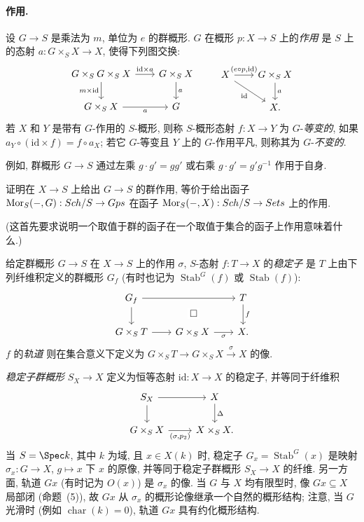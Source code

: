 \paragraph{作用.}
\begin{definition}[作用]\label{src:B.1.10}
设 $G\to S$ 是乘法为 $m$, 单位为 $e$ 的群概形. $G$ 在概形 $p:X\to S$ 上的\textit{作用} 是 $S$ 上的态射 $a:G\times_S X\to X$, 使得下列图交换:
\[
\begin{tikzcd}[column sep=2em]
G\times_S G\times_S X\arrow[r,"\mathrm{id}\times a"]\arrow[d,"m\times\mathrm{id}"']&G\times_S X\arrow[d,"a"]\\
G\times_S X\arrow[r,"a"']&G
\end{tikzcd}
\qquad
\begin{tikzcd}[column sep=2em]
X\arrow[r,"{(e\circ p,\mathrm{id})}"]\arrow[dr,"\mathrm{id}"']&G\times_S X\arrow[d,"a"]\\
&X.
\end{tikzcd}
\]
若 $X$ 和 $Y$ 是带有 $G$-作用的 $S$-概形, 则称 $S$-概形态射 $f:X\to Y$ 为 $G$-\textit{等变的}, 如果 $a_Y\circ(\mathrm{id}\times f)=f\circ a_X$; 若它 $G$-等变且 $Y$ 上的 $G$-作用平凡, 则称其为 $G$-\textit{不变的}.
\end{definition}
例如, 群概形 $G\to S$ 通过左乘 $g\cdot g'=gg'$ 或右乘 $g\cdot g'=g'g^{-1}$ 作用于自身.
\begin{exercise}\label{src:B.1.11}
证明在 $X\to S$ 上给出 $G\to S$ 的群作用, 等价于给出函子 $\operatorname{Mor}_S(-,G):Sch/S\to Gps$ 在函子 $\operatorname{Mor}_S(-,X):Sch/S\to Sets$ 上的作用.

(这首先要求说明一个取值于群的函子在一个取值于集合的函子上作用意味着什么.)
\end{exercise}
\begin{definition}[稳定子与轨道]\label{src:B.1.12}
给定群概形 $G\to S$ 在 $X\to S$ 上的作用 $\sigma$, $S$-态射 $f:T\to X$ 的\textit{稳定子} 是 $T$ 上由下列纤维积定义的群概形 $G_f$ (有时也记为 $\operatorname{Stab}^G(f)$ 或 $\operatorname{Stab}(f)$):
\[
\begin{tikzcd}[column sep=2em]
G_f\arrow[rr]\arrow[d]&&T\arrow[d,"f"]\\
G\times_S T\arrow[r]\arrow[urr,phantom,"\square" description]&G\times_S X\arrow[r,"\sigma"']&X.
\end{tikzcd}
\]
$f$ 的\textit{轨道} 则在集合意义下定义为 $G\times_S T\to G\times_S X\xrightarrow{\sigma}X$ 的像.

\textit{稳定子群概形} $S_X\to X$ 定义为恒等态射 $\mathrm{id}:X\to X$ 的稳定子, 并等同于纤维积
\[
\begin{tikzcd}
S_X\arrow[r]\arrow[d]&X\arrow[d,"\Delta"]\\
G\times_S X\arrow[r,"{(\sigma,p_2)}"']&X\times_S X.
\end{tikzcd}
\]
当 $S=\Spec k$, 其中 $k$ 为域, 且 $x\in X(k)$ 时, 稳定子 $G_x=\operatorname{Stab}^G(x)$ 是映射 $\sigma_x:G\to X$, $g\mapsto x$ 下 $x$ 的原像, 并等同于稳定子群概形 $S_X\to X$ 的纤维. 另一方面, 轨道 $Gx$ (有时记为 $O(x)$) 是 $\sigma_x$ 的像. 当 $G$ 与 $X$ 均有限型时, 像 $Gx\subseteq X$ 局部闭 (命题~(5)), 故 $Gx$ 从 $\sigma_x$ 的概形论像继承一个自然的概形结构; 注意, 当 $G$ 光滑时 (例如 $\operatorname{char}(k)=0$), 轨道 $Gx$ 具有约化概形结构.
\end{definition}

